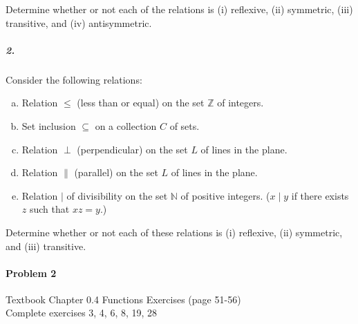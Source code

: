 \documentclass[11pt]{article} %
\begin{document}
		Determine whether or not each of the relations is (i) reflexive, (ii) symmetric, (iii) transitive, and (iv) antisymmetric.
		
		\subparagraph{2.} Consider the following relations:
		
		\begin{enumerate}[a)]
			\item Relation $\leq$ (less than or equal) on the set $\mathbb{Z}$ of integers.
			\item Set inclusion $\subseteq$ on a collection $C$ of sets.
			\item Relation $\perp$ (perpendicular) on the set $L$ of lines in the plane.
			\item Relation $\parallel$ (parallel) on the set $L$ of lines in the plane.
			\item Relation $\mid$ of divisibility on the set $\mathbb{N}$ of positive integers. ($x \mid y$ if there exists $z$ such that $xz = y$.)
		\end{enumerate}
		
		Determine whether or not each of these relations is (i) reflexive, (ii) symmetric, and (iii) transitive.	

	\paragraph{Problem 2} Textbook Chapter 0.4 Functions Exercises (page 51-56)\\
	
	Complete exercises 3, 4, 6, 8, 19, 28
	
		
\end{document}

